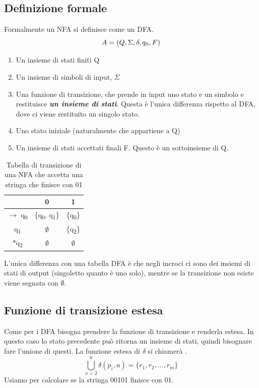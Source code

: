 \documentclass[12pt]{article}
\newcommand{\circumdelta}{%
  \leavevmode\vbox{
    \offinterlineskip
    \ialign{%
      \hfil##\hfil\cr
      \^{}\cr\noalign{\vskip-1ex}
      $\delta$\cr
    }
  }%
}
\begin{document}
\subsection{Definizione formale}
Formalmente un NFA si definisce come un DFA.
\[A = (Q, \Sigma, \delta, q\textsubscript{0}, F)\]
\begin{enumerate}
  \item Un insieme di stati finiti Q
  \item Un insieme di simboli di input, $\Sigma$
  \item Una funzione di transizione, che prende in input uno stato e un simbolo e restituisce \emph{\textbf{un insieme di stati}}. Questa è l'unica differenza rispetto al DFA, dove ci viene restituito un singolo stato.
  \item Uno stato iniziale (naturalmente che appartiene a Q)
  \item Un insieme di stati accettati finali F. Questo è un sottoinsieme di Q.
\end{enumerate}

\begin{table}[ht]
\centering
\begin{tabular}{c || c | c}
& 0 & 1 \\
\hline\hline
  $\rightarrow$ q\textsubscript{0} & \{q\textsubscript{0}, q\textsubscript{1}\} & \{q\textsubscript{0}\} \\
q\textsubscript{1} & $\emptyset$ & \{q\textsubscript{2}\} \\
$*$q\textsubscript{2} & $\emptyset$ & $\emptyset$ \\
\end{tabular}
\caption{Tabella di transizione di una NFA che accetta una stringa che finisce con 01}
\end{table}
L'unica differenza con una tabella DFA è che negli incroci ci sono dei insiemi di stati di output (singoletto quanto è uno solo), mentre se la transizione non esiste viene segnata con $\emptyset$.

\newpage
\subsection{Funzione di transizione estesa}
Come per i DFA bisogna prendere la funzione di transizione e renderla estesa. In questo caso lo stato precedente può ritorna un insieme di stati, quindi bisognare fare l'unione di questi. La funzione estesa di $\delta$ si chiamerà \circumdelta. 
\[\bigcup^k_{x=2}\delta(p_i,a) = \{r_1,r_2,... ,r_m\} \]
Usiamo \circumdelta\space per calcolare se la stringa 00101 finisce con 01. 
\end{document}
